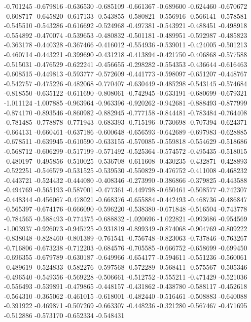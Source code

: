 -0.701245
-0.679816
-0.636530
-0.685109
-0.661367
-0.689600
-0.624460
-0.670672
-0.608717
-0.645820
-0.617133
-0.543855
-0.580821
-0.556916
-0.566141
-0.578581
-0.545510
-0.543286
-0.616692
-0.524968
-0.497381
-0.543921
-0.488451
-0.498918
-0.554892
-0.470074
-0.539653
-0.480832
-0.501181
-0.489951
-0.592987
-0.485823
-0.363178
-0.440328
-0.367466
-0.416012
-0.554936
-0.539011
-0.424005
-0.501213
-0.460714
-0.443221
-0.399690
-0.431218
-0.413894
-0.421750
-0.406868
-0.577588
-0.515031
-0.476529
-0.622241
-0.456655
-0.298282
-0.554353
-0.436644
-0.616463
-0.608515
-0.449813
-0.593777
-0.572609
-0.441773
-0.598097
-0.651207
-0.448767
-0.542757
-0.475226
-0.482068
-0.770407
-0.630449
-0.485298
-0.543145
-0.574684
-0.818550
-0.635122
-0.611690
-0.808061
-0.742945
-0.633191
-0.680699
-0.679321
-1.011124
-1.007885
-0.963964
-0.963396
-0.920262
-0.942681
-0.888493
-0.877999
-0.874170
-0.893546
-0.860982
-0.882945
-0.777158
-0.844481
-0.783484
-0.764408
-0.781485
-0.778878
-0.771943
-0.683393
-0.715196
-0.730698
-0.707394
-0.624371
-0.664131
-0.660461
-0.637186
-0.600648
-0.656593
-0.642689
-0.697983
-0.628885
-0.678511
-0.639945
-0.610590
-0.633155
-0.570085
-0.559818
-0.554629
-0.518686
-0.568712
-0.606299
-0.517199
-0.571492
-0.525364
-0.574572
-0.495435
-0.518015
-0.480197
-0.495856
-0.510025
-0.536708
-0.611608
-0.430235
-0.432871
-0.428893
-0.522251
-0.546579
-0.531525
-0.539530
-0.550829
-0.476752
-0.411008
-0.468232
-0.443721
-0.524432
-0.444080
-0.408346
-0.273990
-0.386866
-0.379825
-0.443588
-0.494769
-0.565193
-0.587001
-0.477361
-0.449798
-0.650461
-0.508577
-0.742307
-0.448344
-0.456067
-0.478021
-0.668376
-0.655884
-0.442493
-0.468736
-0.486847
-0.565397
-0.674176
-0.666090
-0.596220
-0.538380
-0.671848
-0.516504
-0.743778
-0.784565
-0.588493
-0.774375
-0.688832
-1.020696
-1.022821
-0.993686
-0.954569
-1.003937
-0.926073
-0.945725
-0.931819
-0.899349
-0.874068
-0.904769
-0.809222
-0.838048
-0.828460
-0.801389
-0.761541
-0.756748
-0.823063
-0.737846
-0.763267
-0.716806
-0.673238
-0.712203
-0.684576
-0.705585
-0.666752
-0.658699
-0.699450
-0.696355
-0.679789
-0.630187
-0.649966
-0.654177
-0.594611
-0.551236
-0.560061
-0.489619
-0.524833
-0.582276
-0.597568
-0.572289
-0.568411
-0.575567
-0.505346
-0.496540
-0.549356
-0.569228
-0.506661
-0.512752
-0.555211
-0.471429
-0.521036
-0.556493
-0.539891
-0.479865
-0.448157
-0.431862
-0.438780
-0.588117
-0.452618
-0.564310
-0.365062
-0.461015
-0.618001
-0.482440
-0.516461
-0.508883
-0.640088
-0.391922
-0.469871
-0.507269
-0.663307
-0.448236
-0.321280
-0.567467
-0.471695
-0.512886
-0.573170
-0.652334
-0.548431
